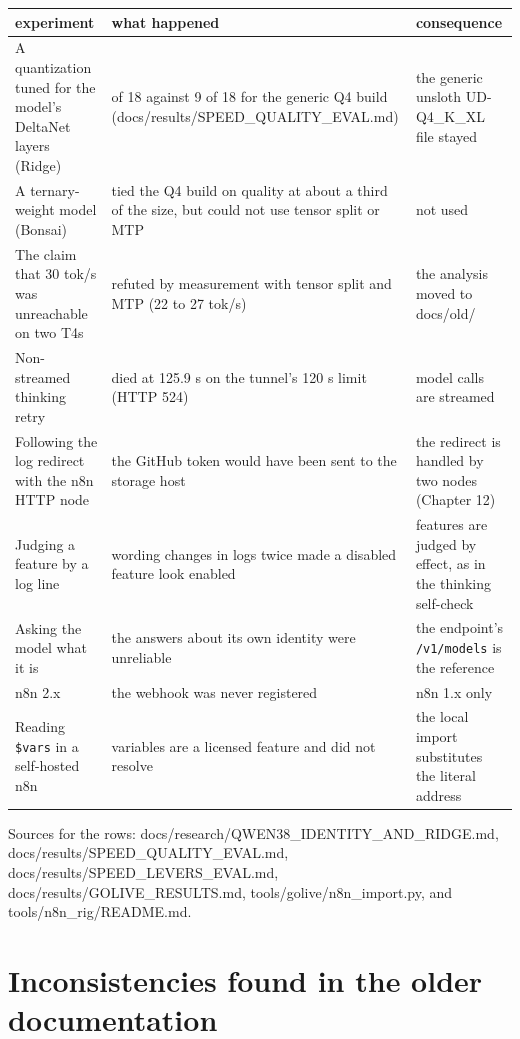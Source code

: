 \documentclass[11pt,a4paper]{report}
\begin{document}
\begin{longtable}{>{\raggedright\arraybackslash}p{0.333\dimexpr\linewidth-6\tabcolsep\relax}>{\raggedright\arraybackslash}p{0.333\dimexpr\linewidth-6\tabcolsep\relax}>{\raggedright\arraybackslash}p{0.333\dimexpr\linewidth-6\tabcolsep\relax}}
\toprule
\textbf{experiment} & \textbf{what happened} & \textbf{consequence} \\
\midrule
\endhead
A quantization tuned for the model's DeltaNet layers (Ridge) & 5 of 18 against 9 of 18 for the generic Q4 build (docs/results/SPEED\_QUALITY\_EVAL.md) & the generic unsloth UD-Q4\_K\_XL file stayed \\
A ternary-weight model (Bonsai) & tied the Q4 build on quality at about a third of the size, but could not use tensor split or MTP & not used \\
The claim that 30 tok/s was unreachable on two T4s & refuted by measurement with tensor split and MTP (22 to 27 tok/s) & the analysis moved to docs/old/ \\
Non-streamed thinking retry & died at 125.9 s on the tunnel's 120 s limit (HTTP 524) & model calls are streamed \\
Following the log redirect with the n8n HTTP node & the GitHub token would have been sent to the storage host & the redirect is handled by two nodes (Chapter 12) \\
Judging a feature by a log line & wording changes in logs twice made a disabled feature look enabled & features are judged by effect, as in the thinking self-check \\
Asking the model what it is & the answers about its own identity were unreliable & the endpoint's \texttt{/\allowbreak{}v1/\allowbreak{}models} is the reference \\
n8n 2.x & the webhook was never registered & n8n 1.x only \\
Reading \texttt{\$vars} in a self-hosted n8n & variables are a licensed feature and did not resolve & the local import substitutes the literal address \\
\bottomrule
\end{longtable}

Sources for the rows: docs/research/QWEN38\_IDENTITY\_AND\_RIDGE.md, docs/results/SPEED\_QUALITY\_EVAL.md, docs/results/SPEED\_LEVERS\_EVAL.md, docs/results/GOLIVE\_RESULTS.md, tools/golive/n8n\_import.py, and tools/n8n\_rig/README.md.

\section{Inconsistencies found in the older documentation}
\end{document}
